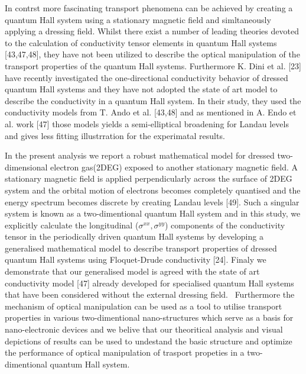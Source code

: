 In contrst more fascinating transport phenomena can be achieved by creating a quantum Hall system using a stationary magnetic field and simltaneously applying a dressing field.
Whilst there exist a number of leading theories devoted to the calculation of conductivity tensor elements in quantum Hall systems [43,47,48], they have not been utilized to describe the optical manipulation of the transport properties of the quantum Hall systems.
Furthermore K. Dini et al. [23] have recently investigated the one-directional conductivity behavior of dressed quantum Hall systems and they have not adopted the state of art model to describe the conductivity in a quantum Hall system. In their study, they used the conductivity models from T. Ando et al. [43,48] and as mentioned in A. Endo et al. work [47] those models yields a semi-elliptical broadening for Landau levels and gives less fitting illustrration for the experimatal results.

In the present analysis we report a robust mathematical model for dressed two-dimensional electron gas(2DEG) exposed to another stationary magnetic field.
A stationary magnetic field is applied perpendicularly across the surface of 2DEG system and the orbital motion of electrons becomes completely quantised and the energy spectrum becomes discrete by creating Landau levels [49].
Such a singular system is known as a two-dimentional quantum Hall system and in this study, we explicitly calculate the longitudinal  ($\sigma^{xx},\sigma^{yy}$) components of the conductivity tensor in the periodically driven quantum Hall systems by developing a generalised mathematical model to describe transport properties of dressed quantum Hall systems using Floquet-Drude conductivity [24].
Finaly we demonstrate that our generalised model is agreed with the state of art conductivity model [47] already developed for specialised quantum Hall systems that have been considered without the external dressing field. 
Furthermore the mechanism of optical manipulation can be used as a tool to utilise transport properties in various two-dimentional nano-structures which serve as a basis for nano-electronic devices and we belive that our theoritical analysis and visual depictions of results can be used to undestand the basic structure and optimize the performance of optical manipulation of trasport propeties in a two-dimentional quantum Hall system.
